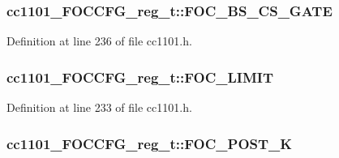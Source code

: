 \subsubsection[{\texorpdfstring{F\+O\+C\+\_\+\+B\+S\+\_\+\+C\+S\+\_\+\+G\+A\+TE}{FOC_BS_CS_GATE}}]{ cc1101\+\_\+\+F\+O\+C\+C\+F\+G\+\_\+reg\+\_\+t\+::\+F\+O\+C\+\_\+\+B\+S\+\_\+\+C\+S\+\_\+\+G\+A\+TE}\hypertarget{structcc1101___f_o_c_c_f_g__reg__t_a72a6a50ad4a9dff37b470d2228360304}{}\label{structcc1101___f_o_c_c_f_g__reg__t_a72a6a50ad4a9dff37b470d2228360304}


Definition at line 236 of file cc1101.\+h.

\subsubsection[{\texorpdfstring{F\+O\+C\+\_\+\+L\+I\+M\+IT}{FOC_LIMIT}}]{ cc1101\+\_\+\+F\+O\+C\+C\+F\+G\+\_\+reg\+\_\+t\+::\+F\+O\+C\+\_\+\+L\+I\+M\+IT}\hypertarget{structcc1101___f_o_c_c_f_g__reg__t_a7c0e58e4cff0421f8f3421b46fbfe7fd}{}\label{structcc1101___f_o_c_c_f_g__reg__t_a7c0e58e4cff0421f8f3421b46fbfe7fd}


Definition at line 233 of file cc1101.\+h.

\subsubsection[{\texorpdfstring{F\+O\+C\+\_\+\+P\+O\+S\+T\+\_\+K}{FOC_POST_K}}]{ cc1101\+\_\+\+F\+O\+C\+C\+F\+G\+\_\+reg\+\_\+t\+::\+F\+O\+C\+\_\+\+P\+O\+S\+T\+\_\+K}\hypertarget{structcc1101___f_o_c_c_f_g__reg__t_a39be001516b4d72e05fb161b98e2b255}{}\label{structcc1101___f_o_c_c_f_g__reg__t_a39be001516b4d72e05fb161b98e2b255}


